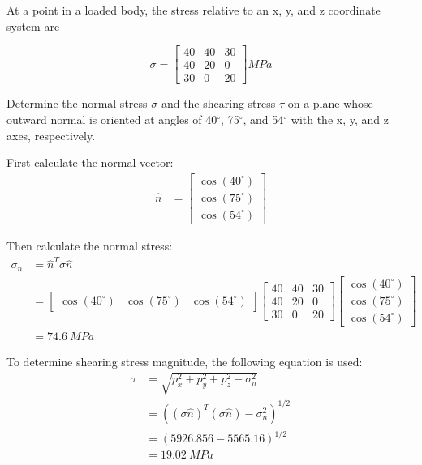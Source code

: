 \section{}
At a point in a loaded body, the stress relative to an x, y, and z coordinate system are 

\begin{equation}
    \sigma = 
    \begin{bmatrix}
        40 & 40 & 30 \\
        40 & 20 & 0 \\
        30 & 0 & 20
    \end{bmatrix}
    \unit{MPa} \nonumber
\end{equation} 

Determine the normal stress $\sigma$ and the shearing stress $\tau$ on a plane whose outward normal is
oriented at angles of 40$^\circ$, 75$^\circ$, and 54$^\circ$ with the x, y, and z axes, respectively.

First calculate the normal vector:
\begin{align}
    \hat{n} &= 
    \begin{bmatrix}
        \cos(40^\circ) \\
        \cos(75^\circ) \\
        \cos(54^\circ)
    \end{bmatrix} \nonumber 
\end{align}

Then calculate the normal stress:
\begin{align}
    \sigma_n &= \hat{n}^T \sigma \hat{n} \nonumber \\
    &= 
    \begin{bmatrix}
        \cos(40^\circ) & \cos(75^\circ) & \cos(54^\circ)
    \end{bmatrix}
    \begin{bmatrix}
        40 & 40 & 30 \\
        40 & 20 & 0 \\
        30 & 0 & 20
    \end{bmatrix}
    \begin{bmatrix}
        \cos(40^\circ) \\
        \cos(75^\circ) \\
        \cos(54^\circ)
    \end{bmatrix} \nonumber \\
    &= \boxed{\qty{74.6}{MPa}} \nonumber
\end{align}

To determine shearing stress magnitude, the following equation is used:
\begin{align}
    \tau &= \sqrt{p_{x}^2 + p_{y}^2 + p_{z}^2 - \sigma_n^2} \nonumber \\
    & = ((\sigma\hat{n})^T (\sigma\hat{n}) - \sigma_n^2)^{1/2} \nonumber \\
    & = (5926.856 - 5565.16)^{1/2} \nonumber \\
    &= \boxed{\qty{19.02}{MPa}} \nonumber
\end{align}